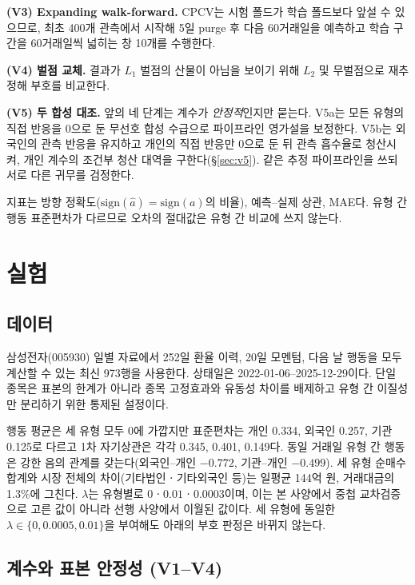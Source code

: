 \textbf{(V3) Expanding walk-forward.} CPCV는 시험 폴드가 학습 폴드보다 앞설 수 있으므로,
최초 400개 관측에서 시작해 5일 purge 후 다음 60거래일을 예측하고 학습 구간을 60거래일씩
넓히는 창 10개를 수행한다.

\textbf{(V4) 벌점 교체.} 결과가 $L_1$ 벌점의 산물이 아님을 보이기 위해 $L_2$ 및
무벌점으로 재추정해 부호를 비교한다.

\textbf{(V5) 두 합성 대조.} 앞의 네 단계는 계수가 \emph{안정적}인지만 묻는다. V5a는
모든 유형의 직접 반응을 0으로 둔 무선호 합성 수급으로 파이프라인 영가설을 보정한다.
V5b는 외국인의 관측 반응을 유지하고 개인의 직접 반응만 0으로 둔 뒤 관측 흡수율로
청산시켜, 개인 계수의 조건부 청산 대역을 구한다(\S\ref{sec:v5}). 같은 추정 파이프라인을
쓰되 서로 다른 귀무를 검정한다.

지표는 방향 정확도($\mathrm{sign}(\hat a)=\mathrm{sign}(a)$의 비율), 예측--실제 상관,
MAE다. 유형 간 행동 표준편차가 다르므로 오차의 절대값은 유형 간 비교에 쓰지 않는다.

\section{실험}
\label{sec:experiments}

\subsection{데이터}
\label{sec:data}

삼성전자(005930) 일별 자료에서 252일 환율 이력, 20일 모멘텀, 다음 날 행동을 모두 계산할
수 있는 최신 973행을 사용한다. 상태일은 2022-01-06--2025-12-29이다. 단일 종목은 표본의
한계가 아니라 종목 고정효과와 유동성 차이를 배제하고 유형 간 이질성만 분리하기 위한
통제된 설정이다.

행동 평균은 세 유형 모두 0에 가깝지만 표준편차는 개인 0.334, 외국인 0.257, 기관 0.125로
다르고 1차 자기상관은 각각 0.345, 0.401, 0.149다. 동일 거래일 유형 간 행동은 강한 음의
관계를 갖는다(외국인--개인 $-0.772$, 기관--개인 $-0.499$). 세 유형 순매수 합계와 시장
전체의 차이(기타법인ㆍ기타외국인 등)는 일평균 144억 원, 거래대금의 1.3\%에 그친다.
$\lambda$는 유형별로 $0$ㆍ$0.01$ㆍ$0.0003$이며, 이는 본 사양에서 중첩 교차검증으로 고른
값이 아니라 선행 사양에서 이월된 값이다. 세 유형에 동일한
$\lambda\in\{0,0.0005,0.01\}$을 부여해도 아래의 부호 판정은 바뀌지 않는다.

\subsection{계수와 표본 안정성 (V1--V4)}
\label{sec:stability}

